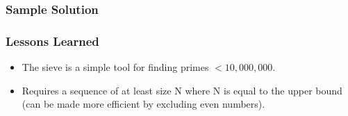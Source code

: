 \subsubsection{Sample Solution}


\subsubsection{Lessons Learned}
\begin{itemize}
	\item The sieve is a simple tool for finding primes $<10,000,000$.
	\item Requires a sequence of at least size N where N is equal to the upper bound (can be made more efficient by excluding even numbers).
\end{itemize}
